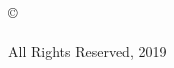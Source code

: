 
\thispagestyle{empty}
\hbox{\ }

\vfill
\renewcommand{\baselinestretch}{1}
\small\normalsize

\vspace{-.65in}

\begin{center}
\normalsize{\copyright \hbox{ }
\text{\thesisauthor}  %
\\
\hspace{1in} \\
All Rights Reserved, 2019}
\end{center}

\vfill
